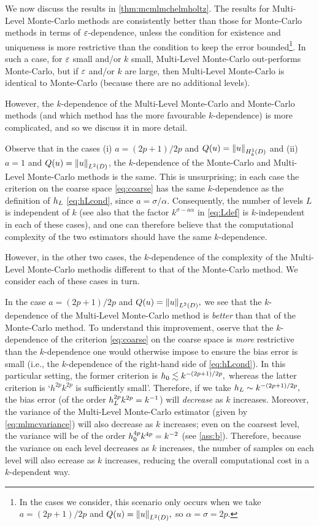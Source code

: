 We now discuss the results in \cref{thm:mcmlmchelmholtz}. The results for Multi-Level Monte-Carlo methods are consistently better than those for Monte-Carlo methods in terms of $\varepsilon$-dependence, unless the condition for existence and uniqueness is more restrictive than the condition to keep the error bounded\footnote{In the cases we consider, this scenario only occurs when we take $a = (2p+1)/2p$ and $Q(u) = \NLtD{u},$ so $\alpha = \sigma = 2p.$}. In such a case, for $\varepsilon$ small and/or $k$ small, Multi-Level Monte-Carlo out-performs Monte-Carlo, but if $\varepsilon$ and/or $k$ are large, then Multi-Level Monte-Carlo is identical to Monte-Carlo (because there are no additional levels).

However, the $k$-dependence of the Multi-Level Monte-Carlo and Monte-Carlo methods (and which method has the more favourable $k$-dependence) is more complicated, and so we discuss it in more detail.

Observe that in the cases (i) $a = (2p+1)/2p$ and $Q(u) = \NHokD{u}$ and (ii) $a=1$ and $Q(u) = \NLtD{u}$, the $k$-dependence of the Monte-Carlo and Multi-Level Monte-Carlo methods is the same. This is unsurprising; in each case the criterion on the coarse space \cref{eq:coarse} has the same $k$-dependence as the definition of $h_{L}$ \cref{eq:hLcond}, since $a = \sigma/\alpha.$ Consequently, the number of levels $L$ is independent of $k$ (see also that the factor $k^{\sigma - a\alpha}$ in \cref{eq:Ldef} is $k$-independent in each of these cases), and one can therefore believe that the computational complexity of the two estimators should have the same $k$-dependence.

However, in the other two cases, the $k$-dependence of the complexity of the Multi-Level Monte-Carlo methodis different to that of the Monte-Carlo method. We consider each of these cases in turn.

In the case $a=(2p+1)/2p$ and $Q(u) = \NLtD{u},$ we see that the $k$-dependence of the Multi-Level Monte-Carlo method is \emph{better} than that of the Monte-Carlo method. To understand this improvement, oserve that the $k$-dependence of the criterion \cref{eq:coarse} on the coarse space is \emph{more} restrictive than the $k$-dependence one would otherwise impose to ensure the bias error is small (i.e., the $k$-dependence of the right-hand side of \cref{eq:hLcond}). In this particular setting, the former criterion is $h_{0} \lesssim k^{-(2p+1)/2p},$ whereas the latter criterion is `$h^{2p}k^{2p}$ is sufficiently small'. Therefore, if we take $h_{L} \sim k^{-(2p+1)/2p},$ the bias error (of the order $h_{L}^{2p}k^{2p} = k^{-1}$) will \emph{decrease} as $k$ increases. Moreover, the variance of the Multi-Level Monte-Carlo estimator (given by \cref{eq:mlmcvariance}) will also decrease as $k$ increases; even on the coarsest level, the variance will be of the order $h_{0}^{4p}k^{4p} = k^{-2}$ (see \cref{ass:b}). Therefore, because the variance on each level decreases as $k$ increases, the number of samples on each level will also ecrease as $k$ increases, reducing the overall computational cost in a $k$-dependent way.

